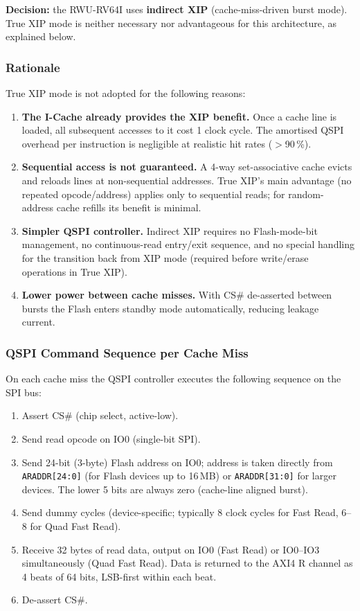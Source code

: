 \textbf{Decision:} the RWU-RV64I uses \textbf{indirect XIP}
(cache-miss-driven burst mode).
True XIP mode is neither necessary nor advantageous for this architecture,
as explained below.

\subsubsection{Rationale}

True XIP mode is not adopted for the following reasons:

\begin{enumerate}
  \item \textbf{The I-Cache already provides the XIP benefit.}
    Once a cache line is loaded, all subsequent accesses to it cost 1
    clock cycle.
    The amortised QSPI overhead per instruction is negligible at
    realistic hit rates ($>$90\,\%).
  \item \textbf{Sequential access is not guaranteed.}
    A 4-way set-associative cache evicts and reloads lines at
    non-sequential addresses.
    True XIP's main advantage (no repeated opcode/address) applies
    only to sequential reads; for random-address cache refills its
    benefit is minimal.
  \item \textbf{Simpler QSPI controller.}
    Indirect XIP requires no Flash-mode-bit management, no
    continuous-read entry/exit sequence, and no special handling for
    the transition back from XIP mode (required before write/erase
    operations in True XIP).
  \item \textbf{Lower power between cache misses.}
    With CS\# de-asserted between bursts the Flash enters standby
    mode automatically, reducing leakage current.
\end{enumerate}

\subsubsection{QSPI Command Sequence per Cache Miss}

On each cache miss the QSPI controller executes the following sequence
on the SPI bus:

\begin{enumerate}
  \item Assert CS\# (chip select, active-low).
  \item Send read opcode on IO0 (single-bit SPI).
  \item Send 24-bit (3-byte) Flash address on IO0; address is taken
    directly from \texttt{ARADDR[24:0]} (for Flash devices up to 16\,MB)
    or \texttt{ARADDR[31:0]} for larger devices.
    The lower 5 bits are always zero (cache-line aligned burst).
  \item Send dummy cycles (device-specific; typically 8 clock cycles
    for Fast Read, 6--8 for Quad Fast Read).
  \item Receive 32 bytes of read data, output on IO0 (Fast Read) or
    IO0--IO3 simultaneously (Quad Fast Read).
    Data is returned to the AXI4 R channel as 4 beats of 64 bits,
    LSB-first within each beat.
  \item De-assert CS\#.
\end{enumerate}


